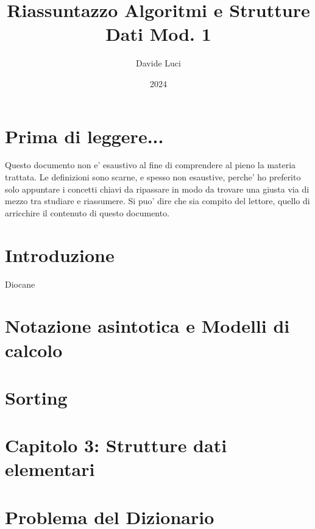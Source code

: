 \documentclass{article}
\title{Riassuntazzo Algoritmi e Strutture Dati Mod. 1}
\author{Davide Luci}
\date{2024}
\begin{document}
    \maketitle
    \tableofcontents
    \newpage


    \setlength{\parindent}{0pt}
    \section{ Prima di leggere...}
    Questo documento non e' esaustivo al fine di comprendere al pieno la materia trattata.
    Le definizioni sono scarne, e spesso non esaustive, perche' ho preferito solo appuntare i concetti chiavi
    da ripassare in modo da trovare una giusta via di mezzo tra studiare e riassumere. Si puo' dire che sia compito del 
    lettore, quello di arricchire il contenuto di questo documento.

    \newpage

    \section*{ Introduzione}
    Diocane

    \newpage
    \section{ Notazione asintotica e Modelli di calcolo}

    \newpage
    \section{ Sorting }

    \newpage
    \section{ Capitolo 3: Strutture dati elementari }
        
    \section {Problema del Dizionario}
        
    
\end{document}
